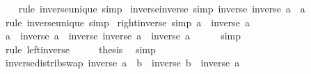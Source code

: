 \begin{isabellebody}
%
\isadelimproof
\ \ %
\endisadelimproof
%
\isatagproof
{}\isamarkupfalse%
\ {\isacharparenleft}{\kern0pt}rule\ inverse{\isacharunderscore}{\kern0pt}unique{\isacharparenright}{\kern0pt}\ simp%
\endisatagproof
{\isafoldproof}%
%
\isadelimproof
\isanewline
%
\endisadelimproof
\isanewline
{}\isamarkupfalse%
\ inverse{\isacharunderscore}{\kern0pt}inverse\ {\isacharbrackleft}{\kern0pt}simp{\isacharbrackright}{\kern0pt}{\isacharcolon}{\kern0pt}\ {\isachardoublequoteopen}inverse\ {\isacharparenleft}{\kern0pt}inverse\ a{\isacharparenright}{\kern0pt}\ {\isacharequal}{\kern0pt}\ a{\isachardoublequoteclose}\isanewline
%
\isadelimproof
\ \ %
\endisadelimproof
%
\isatagproof
{}\isamarkupfalse%
\ {\isacharparenleft}{\kern0pt}rule\ inverse{\isacharunderscore}{\kern0pt}unique{\isacharparenright}{\kern0pt}\ simp%
\endisatagproof
{\isafoldproof}%
%
\isadelimproof
\isanewline
%
\endisadelimproof
\isanewline
{}\isamarkupfalse%
\ right{\isacharunderscore}{\kern0pt}inverse\ {\isacharbrackleft}{\kern0pt}simp{\isacharbrackright}{\kern0pt}{\isacharcolon}{\kern0pt}\ {\isachardoublequoteopen}a\ \isactrlbold {\isacharasterisk}{\kern0pt}\ inverse\ a\ {\isacharequal}{\kern0pt}\ \isanewline
%
\isadelimproof
%
\endisadelimproof
%
\isatagproof
{}\isamarkupfalse%
\ {\isacharminus}{\kern0pt}\isanewline
\ \ \isamarkupfalse%
\ {\isachardoublequoteopen}a\ \isactrlbold {\isacharasterisk}{\kern0pt}\ inverse\ a\ {\isacharequal}{\kern0pt}\ inverse\ {\isacharparenleft}{\kern0pt}inverse\ a{\isacharparenright}{\kern0pt}\ \isactrlbold {\isacharasterisk}{\kern0pt}\ inverse\ a{\isachardoublequoteclose}\isanewline
\ \ \ \ \isamarkupfalse%
\ simp\isanewline
\ \ \isamarkupfalse%
\ \isamarkupfalse%
\ {\isachardoublequoteopen}{\isasymdots}\ {\isacharequal}{\kern0pt}\ \isanewline
\ \ \ \ \isamarkupfalse%
\ {\isacharparenleft}{\kern0pt}rule\ left{\isacharunderscore}{\kern0pt}inverse{\isacharparenright}{\kern0pt}\isanewline
\ \ \isamarkupfalse%
\ \isamarkupfalse%
\ {\isacharquery}{\kern0pt}thesis\ \isamarkupfalse%
\ simp\isanewline
{}\isamarkupfalse%
%
\endisatagproof
{\isafoldproof}%
%
\isadelimproof
\isanewline
%
\endisadelimproof
\isanewline
{}\isamarkupfalse%
\ inverse{\isacharunderscore}{\kern0pt}distrib{\isacharunderscore}{\kern0pt}swap{\isacharcolon}{\kern0pt}\ {\isachardoublequoteopen}inverse\ {\isacharparenleft}{\kern0pt}a\ \isactrlbold {\isacharasterisk}{\kern0pt}\ b{\isacharparenright}{\kern0pt}\ {\isacharequal}{\kern0pt}\ inverse\ b\ \isactrlbold {\isacharasterisk}{\kern0pt}\ inverse\ a{\isachardoublequoteclose}\isanewline

\end{isabellebody}

